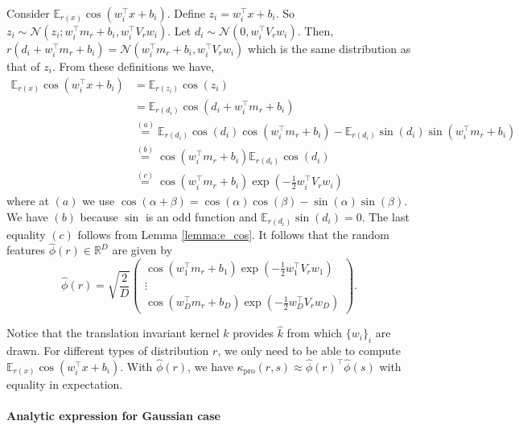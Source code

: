 \documentclass[english]{article}
\theoremstyle{plain}
\theoremstyle{plain}
\begin{document}
Consider $\mathbb{E}_{r(x)}\cos\left(w_{i}^{\top}x+b_{i}\right)$.
Define $z_{i}=w_{i}^{\top}x+b_{i}$. So $z_{i}\sim\mathcal{N}(z_{i};w_{i}^{\top}m_{r}+b_{i},w_{i}^{\top}V_{r}w_{i})$.
Let $d_{i}\sim\mathcal{N}(0,w_{i}^{\top}V_{r}w_{i})$. Then, $r(d_{i}+w_{i}^{\top}m_{r}+b_{i})=\mathcal{N}(w_{i}^{\top}m_{r}+b_{i},w_{i}^{\top}V_{r}w_{i})$
which is the same distribution as that of $z_{i}$. From these definitions
we have,
%
\begin{align*}
\mathbb{E}_{r(x)}\cos\left(w_{i}^{\top}x+b_{i}\right) & =\mathbb{E}_{r(z_{i})}\cos(z_{i})\\
 & =\mathbb{E}_{r(d_{i})}\cos\left(d_{i}+w_{i}^{\top}m_{r}+b_{i}\right)\\
 & \overset{(a)}
 {=}\mathbb{E}_{r(d_{i})}\cos(d_{i})\cos(w_{i}^{\top}m_{r}+b_{i})-\mathbb{E}_{r(d_{i})}\sin(d_{i})\sin
 (w_{i}^{\top}m_{r}+b_{i})\\
 & \overset{(b)}{=}\cos(w_{i}^{\top}m_{r}+b_{i})\mathbb{E}_{r(d_{i})}\cos(d_{i})\\
 & \overset{(c)}{=}\cos(w_{i}^{\top}m_{r}+b_{i})\exp\left(-\frac{1}{2}w_{i}^{\top}V_{r}w_{i}\right)
\end{align*}
where at $(a)$ we use $\cos(\alpha+\beta)=\cos(\alpha)\cos(\beta)-\sin(\alpha)\sin(\beta)$.
We have $(b)$ because $\sin$ is an odd function and $\mathbb{E}_{r(d_{i})}\sin(d_{i})=0$.
The last equality $(c)$ follows from Lemma \ref{lemma:e_cos}. It
follows that the random features $\hat{\phi}(r)\in\mathbb{R}^{D}$
are given by
\[
\hat{\phi}(r)=\sqrt{\frac{2}{D}}\left(\begin{array}{c}
\cos(w_{1}^{\top}m_{r}+b_{1})\exp\left(-\frac{1}{2}w_{1}^{\top}V_{r}w_{1}\right)\\
\vdots\\
\cos(w_{D}^{\top}m_{r}+b_{D})\exp\left(-\frac{1}{2}w_{D}^{\top}V_{r}w_{D}\right)
\end{array}\right).
\]


Notice that the translation invariant kernel $k$
provides $\hat{k}$ from which $\{w_{i}\}_{i}$ are
drawn. For different types of distribution $r$, we only need to
be able to compute $\mathbb{E}_{r(x)}\cos\left(w_{i}^{\top}x+b_{i}\right)$.
With $\hat{\phi}(r)$, we have $\kappa_\text{pro}(r, s)\approx\hat{\phi}(r)^{\top}\hat{\phi}(s)$
with equality in expectation.


\paragraph{Analytic expression for Gaussian case}
\end{document}
